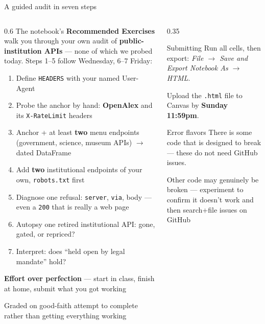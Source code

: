 \documentclass[9pt,aspectratio=169]{beamer}
\begin{document}
\begin{frame}{A guided audit in seven steps}
    \begin{columns}[T]
        \begin{column}{0.6\textwidth}
            The notebook's \textbf{Recommended Exercises} walk you through your own audit of \textbf{public-institution APIs} --- none of which we probed today. Steps 1--5 follow Wednesday, 6--7 Friday:
            \begin{enumerate}\footnotesize
                \item Define \texttt{HEADERS} with your named User-Agent
                \item Probe the anchor by hand: \textbf{OpenAlex} and its \texttt{X-RateLimit} headers
                \item Anchor + at least \textbf{two} menu endpoints (government, science, museum APIs) $\rightarrow$ dated DataFrame
                \item Add \textbf{two} institutional endpoints of your own, \texttt{robots.txt} first
                \item Diagnose one refusal: \texttt{server}, \texttt{via}, body --- even a \texttt{200} that is really a web page
                \item Autopsy one retired institutional API: gone, gated, or repriced?
                \item Interpret: does ``held open by legal mandate'' hold?
            \end{enumerate}

            \medskip
            \textbf{Effort over perfection} --- start in class, finish at home, submit what you got working

            \medskip
            Graded on good-faith attempt to complete rather than getting everything working
        \end{column}
        \begin{column}{0.35\textwidth}
            \begin{block}{Submitting}
                \footnotesize 
                Run all cells, then export: \textit{File $\rightarrow$ Save and Export Notebook As $\rightarrow$ HTML}. 
                
                \smallskip
                Upload the \texttt{.html} file to Canvas by \textbf{Sunday 11:59pm}.
            \end{block}
            \begin{alertblock}{Error flavors}
                \footnotesize
                    There is some code that is designed to break --- these do not need GitHub issues. 
            
                    \medskip
                    Other code may genuinely be broken --- experiment to confirm it doesn't work and then search+file issues on GitHub
            \end{alertblock}
        \end{column}
    \end{columns}
\end{frame}
\end{document}

